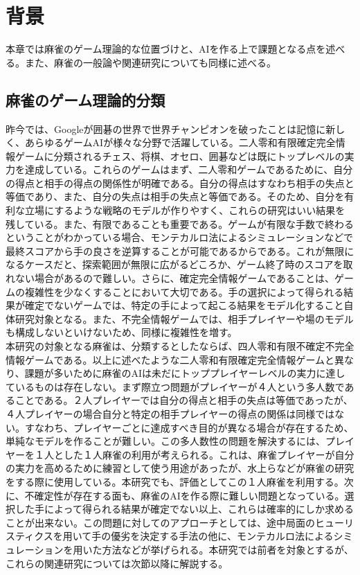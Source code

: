 \chapter{背景}
\label{chap:relevantstudy}

本章では麻雀のゲーム理論的な位置づけと、AIを作る上で課題となる点を述べる。また、麻雀の一般論や関連研究についても同様に述べる。

\section{麻雀のゲーム理論的分類}
昨今では、Googleが囲碁の世界で世界チャンピオンを破ったことは記憶に新しく\cite{go}、あらゆるゲームAIが様々な分野で活躍している。二人零和有限確定完全情報ゲームに分類されるチェス、将棋、オセロ、囲碁などは既にトップレベルの実力を達成している。これらのゲームはまず、二人零和ゲームであるために、自分の得点と相手の得点の関係性が明確である。自分の得点はすなわち相手の失点と等価であり、また、自分の失点は相手の失点と等価である。そのため、自分を有利な立場にするような戦略のモデルが作りやすく、これらの研究はいい結果を残している。また、有限であることも重要である。ゲームが有限な手数で終わるということがわかっている場合、モンテカルロ法によるシミュレーションなどで最終スコアから手の良さを逆算することが可能であるからである。これが無限になるケースだと、探索範囲が無限に広がるどころか、ゲーム終了時のスコアを取れない場合があるので難しい。さらに、確定完全情報ゲームであることは、ゲームの複雑性を少なくすることにおいて大切である。手の選択によって得られる結果が確定でないゲームでは、特定の手によって起こる結果をモデル化すること自体研究対象となる。また、不完全情報ゲームでは、相手プレイヤーや場のモデルも構成しないといけないため、同様に複雑性を増す。
\\本研究の対象となる麻雀は、分類するとしたならば、四人零和有限不確定不完全情報ゲームである。以上に述べたような二人零和有限確定完全情報ゲームと異なり、課題が多いために麻雀のAIは未だにトッププレイヤーレベルの実力に達しているものは存在しない。まず際立つ問題がプレイヤーが４人という多人数であることである。２人プレイヤーでは自分の得点と相手の失点は等価であったが、４人プレイヤーの場合自分と特定の相手プレイヤーの得点の関係は同様ではない。すなわち、プレイヤーごとに達成すべき目的が異なる場合が存在するため、単純なモデルを作ることが難しい。この多人数性の問題を解決するには、プレイヤーを１人とした１人麻雀の利用が考えられる。これは、麻雀プレイヤーが自分の実力を高めるために練習として使う用途があったが、水上ら\cite{bakuuti}などが麻雀の研究をする際に使用している。本研究でも、評価としてこの１人麻雀を利用する。次に、不確定性が存在する面も、麻雀のAIを作る際に難しい問題となっている。選択した手によって得られる結果が確定でない以上、これらは確率的にしか求めることが出来ない。この問題に対してのアプローチとしては、途中局面のヒューリスティクスを用いて手の優劣を決定する手法の他に、モンテカルロ法によるシミュレーションを用いた方法などが挙げられる。本研究では前者を対象とするが、これらの関連研究については次節以降に解説する。

